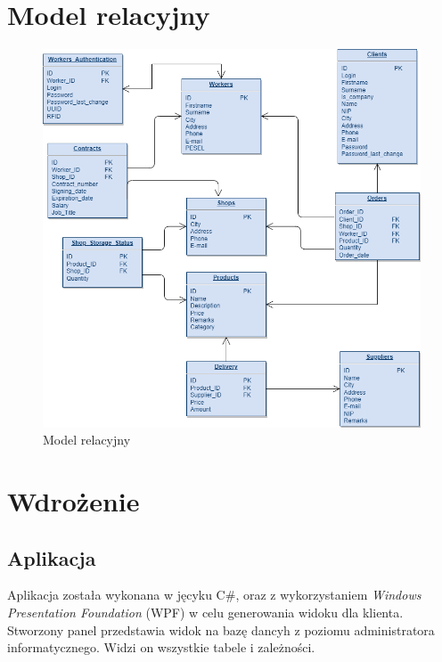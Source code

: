 \documentclass[12pt,a4paper]{article}
\begin{document}
    \section{Model relacyjny}
        \begin{figure}[H]
            \centering
            \includegraphics[width=\textwidth, height = 0.88\textheight]{images/ModelRelacyjny.png}
            \caption{Model relacyjny}
        \end{figure}
        
    \section{Wdrożenie}
        \subsection{Aplikacja}
            Aplikacja została wykonana w jęcyku C#, oraz z wykorzystaniem \textit{Windows Presentation Foundation} (WPF) w celu generowania widoku dla klienta. Stworzony panel przedstawia widok na bazę dancyh z poziomu administratora informatycznego. Widzi on wszystkie tabele i zależności.
        
\end{document}
